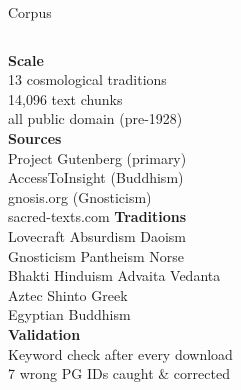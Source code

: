 \documentclass[10pt, aspectratio=169]{beamer}
\begin{document}
\begin{frame}{Corpus}
  \begin{columns}[T]
      \textbf{Scale}\\[0.4em]
      13 cosmological traditions\\
      14,096 text chunks\\
      all public domain (pre-1928)\\[0.8em]
      \textbf{Sources}\\[0.4em]
      Project Gutenberg (primary)\\
      AccessToInsight (Buddhism)\\
      gnosis.org (Gnosticism)\\
      sacred-texts.com
      \textbf{Traditions}\\[0.4em]
      Lovecraft \textbullet{} Absurdism \textbullet{} Daoism\\
      Gnosticism \textbullet{} Pantheism \textbullet{} Norse\\
      Bhakti Hinduism \textbullet{} Advaita Vedanta\\
      Aztec \textbullet{} Shinto \textbullet{} Greek\\
      Egyptian \textbullet{} Buddhism\\[0.8em]
      \textbf{Validation}\\[0.4em]
      Keyword check after every download\\
      7 wrong PG IDs caught \& corrected
  \end{columns}
\end{frame}
\end{document}

